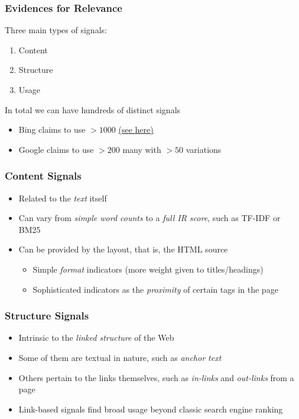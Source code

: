 \documentclass{beamer}
\begin{document}
\begin{frame}
    \frametitle{Evidences for Relevance}
    Three main types of signals:
    \begin{block}{}
        \begin{enumerate}
        \item Content
        \item Structure
        \item Usage
        \end{enumerate}
    \end{block}
    \vfill
    In total we can have hundreds of distinct signals
    \begin{itemize}
    \item Bing claims to use $>1000$
        \href{http://www.bing.com/blogs/site_blogs/b/search/archive/2010/10/13/new-signals-in-search-the-bing-social-layer.aspx}{(see
          \underline{here})}
    \item Google claims to use $>200$ many with $>50$ variations
    \end{itemize}
    \vfill
\end{frame}

\begin{frame}
    \frametitle{Content Signals}
    \begin{itemize}
    \item Related to the \emph{text} itself
    \item Can vary from \emph{simple word counts} to a \emph{full IR score},
        such as TF-IDF or BM25
    \item Can be provided by the layout, that is, the HTML source
        \begin{itemize}
        \item Simple \emph{format} indicators (more weight given to
            titles/headings)
        \item Sophisticated indicators as the \emph{proximity} of certain tags
            in the page
        \end{itemize}
    \end{itemize}
\end{frame}

\begin{frame}
    \frametitle{Structure Signals}
    \begin{itemize}
    \item Intrinsic to the \emph{linked structure} of the Web
    \item Some of them are textual in nature, such as \emph{anchor text}
    \item Others pertain to the links themselves, such as \emph{in-links} and
        \emph{out-links} from a page
    \item Link-based signals find broad usage beyond classic search engine
        ranking
    \end{itemize}
\end{frame}
\end{document}
